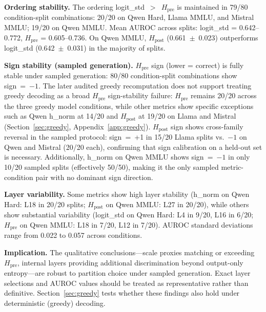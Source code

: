 \documentclass{ieeeaccess}
\newcommand{\Hpre}{H_{\text{pre}}}
\newcommand{\Hpost}{H_{\text{post}}}
\begin{document}
\textbf{Ordering stability.} The ordering logit\_std~$>$~$\Hpre$ is maintained in 79/80 condition-split combinations: 20/20 on Qwen Hard, Llama MMLU, and Mistral MMLU; 19/20 on Qwen MMLU. Mean AUROC across splits: logit\_std = 0.642--0.772, $\Hpre$ = 0.605--0.736. On Qwen MMLU, $\Hpost$ (0.661~$\pm$~0.023) outperforms logit\_std (0.642~$\pm$~0.031) in the majority of splits.

\textbf{Sign stability (sampled generation).} $\Hpre$ sign (lower = correct) is fully stable under sampled generation: 80/80 condition-split combinations show sign~=~$-1$. The later audited greedy recomputation does not support treating greedy decoding as a broad $\Hpre$ sign-stability failure: $\Hpre$ remains 20/20 across the three greedy model conditions, while other metrics show specific exceptions such as Qwen h\_norm at 14/20 and $\Hpost$ at 19/20 on Llama and Mistral (Section~\ref{sec:greedy}, Appendix~\ref{app:greedy}). $\Hpost$ sign shows cross-family reversal in the sampled protocol: sign~=~+1 in 15/20 Llama splits vs.\ $-1$ on Qwen and Mistral (20/20 each), confirming that sign calibration on a held-out set is necessary. Additionally, h\_norm on Qwen MMLU shows sign~=~$-1$ in only 10/20 sampled splits (effectively 50/50), making it the only sampled metric-condition pair with no dominant sign direction.

\textbf{Layer variability.} Some metrics show high layer stability (h\_norm on Qwen Hard: L18 in 20/20 splits; $\Hpost$ on Qwen MMLU: L27 in 20/20), while others show substantial variability (logit\_std on Qwen Hard: L4 in 9/20, L16 in 6/20; $\Hpre$ on Qwen MMLU: L18 in 7/20, L12 in 7/20). AUROC standard deviations range from 0.022 to 0.057 across conditions.

\textbf{Implication.} The qualitative conclusions---scale proxies matching or exceeding $\Hpre$, internal layers providing additional discrimination beyond output-only entropy---are robust to partition choice under sampled generation. Exact layer selections and AUROC values should be treated as representative rather than definitive. Section~\ref{sec:greedy} tests whether these findings also hold under deterministic (greedy) decoding.
\end{document}
